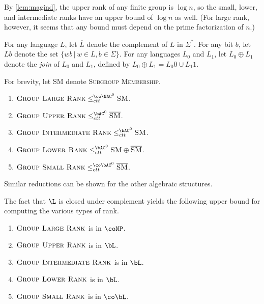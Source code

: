 \documentclass{article}
\begin{document}
By \autoref{lem:magind}, the upper rank of any finite group is $\log n$, so the small, lower, and intermediate ranks have an upper bound of $\log n$ as well.
(For large rank, however, it seems that any bound must depend on the prime factorization of $n$.)

For any language $L$, let $\overline{L}$ denote the complement of $L$ in $\Sigma^*$.
For any bit $b$, let $Lb$ denote the set $\{ wb \, | \, w \in L, b \in \Sigma\}$.
For any languages $L_0$ and $L_1$, let $L_0 \oplus L_1$ denote the \emph{join} of $L_0$ and $L_1$, defined by $L_0 \oplus L_1 = L_0 0 \cup L_1 1$.

\begin{lemma}
  For brevity, let \textsc{SM} denote \textsc{Subgroup Membership}.
  \mbox{}
  \begin{enumerate}
  \item $\textsc{Group Large Rank} \leq_{ctt}^{\co\NAC^0} \textsc{SM}$.
  \item $\textsc{Group Upper Rank} \leq_{ctt}^{\bAC^0} \overline{\textsc{SM}}$.
  \item $\textsc{Group Intermediate Rank} \leq_{ctt}^{\bAC^0} \textsc{SM}$.
  \item $\textsc{Group Lower Rank} \leq_{ctt}^{\bAC^0} \textsc{SM} \oplus \overline{\textsc{SM}}$.
  \item $\textsc{Group Small Rank} \leq_{ctt}^{\co\bAC^0} \overline{\textsc{SM}}$.
  \end{enumerate}
\end{lemma}

Similar reductions can be shown for the other algebraic structures.

The fact that $\L$ is closed under complement yields the following upper bound for computing the various types of rank.

\begin{theorem}
  \mbox{}
  \begin{enumerate}
  \item $\textsc{Group Large Rank}$ is in $\coNP$.
  \item $\textsc{Group Upper Rank}$ is in $\bL$.
  \item $\textsc{Group Intermediate Rank}$ is in $\bL$.
  \item $\textsc{Group Lower Rank}$ is in $\bL$.
  \item $\textsc{Group Small Rank}$ is in $\co\bL$.
  \end{enumerate}
\end{theorem}
\end{document}
